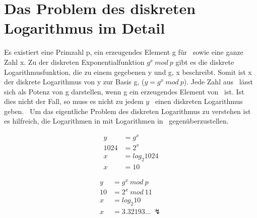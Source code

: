 	\section*{Das Problem des diskreten Logarithmus im Detail}\label{Das Problem des diskreten Logarithmus im Detail}
		Es existiert eine Primzahl p, ein erzeugendes Element g für \myZPStern~sowie eine ganze Zahl x. Zu der diskreten Exponentialfunktion $g^x~mod~p$ gibt es die diskrete Logarithmusfunktion, die zu einem gegebenen y und g, x beschreibt. Somit ist x der diskrete Logarithmus von y zur Basis g, ($y = g^x~mod~p$). Jede Zahl aus \myZPStern~lässt sich als Potenz von g darstellen, wenn g ein erzeugendes Element von \myZPStern~ist. Ist dies nicht der Fall, so muss es nicht zu jedem $y$ \myin \myZPStern~einen diskreten Logarithmus geben.~\cite{Kryptografie:in:Theorie:und:Praxis} Um das eigentliche Problem des diskreten Logarithmus zu verstehen ist es hilfreich, die Logarithmen in  mit Logarithmen in \myZPStern~gegenüberzustellen.
		
		\begin{minipage}{0.44\textwidth}
			\begin{equation}
			\begin{aligned}
			y &= g^x\\
			1024 &= 2^x\\
			x &= log_2 1024\\
			x &= 10
			\end{aligned}
			\label{Gleichung Log in Z}
			\end{equation}
		\end{minipage}
		\begin{minipage}{0.44\textwidth}
			\begin{equation}
			\begin{aligned}
			y &= g^x~mod~p\\
			10 &= 2^x~mod~11\\
			x &= log_2 10\\
			x &= 3.32193...~\lightning
			\end{aligned}
			\label{Gleichung Log in ZP}
			\end{equation}
		\end{minipage}
		

